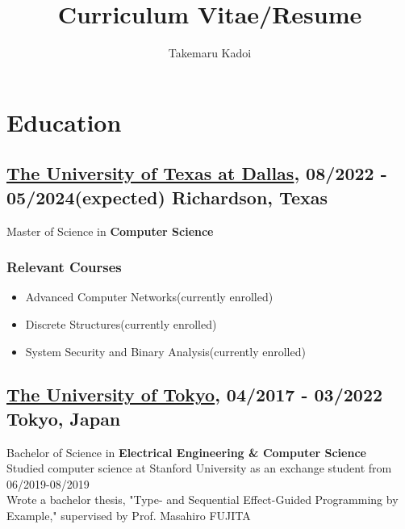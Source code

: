 \documentclass[10pt]{article}
\title{\vspace{-1cm}Curriculum Vitae/Resume}
\author{Takemaru Kadoi}
\date{}
\begin{document}
\section*{Education}
  \subsection*{\underline{The University of Texas at Dallas}, 08/2022 - 05/2024(expected) \hfill Richardson, Texas}
    Master of Science in \textbf{Computer Science}
    \subsubsection*{Relevant Courses}
    \begin{multicols}{2}
      \begin{itemize}[noitemsep]
        \item Advanced Computer Networks(currently enrolled)
        \item Discrete Structures(currently enrolled)
        \item System Security and Binary Analysis(currently enrolled)
      \end{itemize}
    \end{multicols}

  \subsection*{\underline{The University of Tokyo}, 04/2017 -  03/2022 \hfill Tokyo, Japan}
    Bachelor of Science in \textbf{Electrical Engineering \& Computer Science}
    \\
    Studied computer science at Stanford University as an exchange student from 06/2019-08/2019
    \\
    Wrote a bachelor thesis, "Type- and Sequential Effect-Guided Programming by Example," supervised by Prof. Masahiro FUJITA
\end{document}
